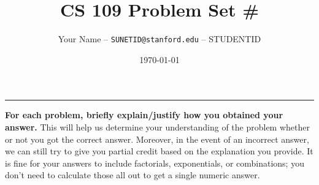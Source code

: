 \documentclass[12pt]{article}
\title{CS 109 Problem Set \#}
\author{Your Name -- \texttt{SUNETID@stanford.edu} -- STUDENTID}
\date{\today}
\begin{document}
  \maketitle

  \vspace{-0.3in}
  \noindent
  \rule{\linewidth}{0.4pt}

  \noindent
  \textbf{For each problem, briefly explain/justify how you
  obtained your answer.} This will help us determine your understanding of
  the problem whether or not you got the correct answer. Moreover, in the
  event of an incorrect answer, we can still try to give you partial credit
  based on the explanation you provide. It is fine for your answers to include
  factorials, exponentials, or combinations; you don't need to calculate those
  all out to get a single numeric answer.


\end{document}
